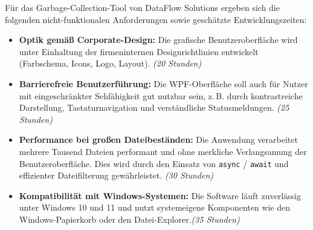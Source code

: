 Für das Garbage-Collection-Tool von DataFlow Solutions ergeben sich die folgenden nicht-funktionalen Anforderungen sowie geschätzte Entwicklungszeiten:

\begin{itemize}
  \item \textbf{Optik gemäß Corporate-Design:} Die grafische Benutzeroberfläche wird unter Einhaltung der firmeninternen Designrichtlinien entwickelt (Farbschema, Icons, Logo, Layout). \textit{(20 Stunden)}

  \item \textbf{Barrierefreie Benutzerführung:} Die WPF-Oberfläche soll auch für Nutzer mit eingeschränkter Sehfähigkeit gut nutzbar sein, z.\,B. durch kontrastreiche Darstellung, Tastaturnavigation und verständliche Statusmeldungen. \textit{(25 Stunden)}

  \item \textbf{Performance bei großen Dateibeständen:} Die Anwendung verarbeitet mehrere Tausend Dateien performant und ohne merkliche Verlangsamung der Benutzeroberfläche. Dies wird durch den Einsatz von \texttt{async} / \texttt{await} und effizienter Dateifilterung gewährleistet. \textit{(30 Stunden)}

  \item \textbf{Kompatibilität mit Windows-Systemen:} Die Software läuft zuverlässig unter Windows 10 und 11 und nutzt systemeigene Komponenten wie den Windows-Papierkorb oder den Datei-Explorer.\textit{(35 Stunden)}
\end{itemize}
